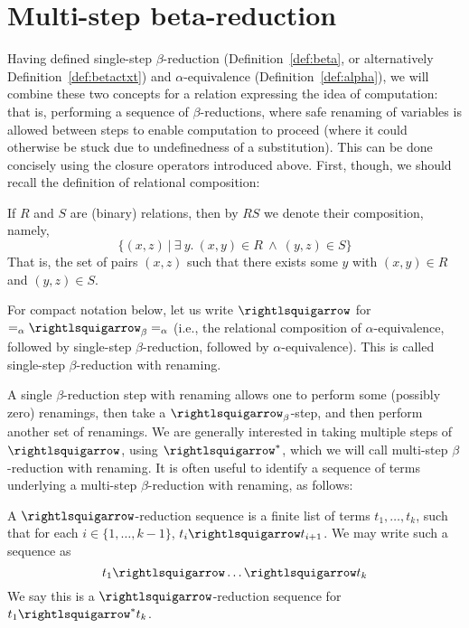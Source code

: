 \section{Multi-step beta-reduction}
\label{sec:multibeta}

Having defined single-step $\beta$-reduction
(Definition~\ref{def:beta}, or alternatively
Definition~\ref{def:betactxt}) and $\alpha$-equivalence
(Definition~\ref{def:alpha}), we will combine these two concepts for a
relation expressing the idea of computation: that is, performing a
sequence of $\beta$-reductions, where safe renaming of variables is
allowed between steps to enable computation to proceed (where it could
otherwise be stuck due to undefinedness of a substitution).  This can
be done concisely using the closure operators introduced above.
First, though, we should recall the definition of relational
composition:

\begin{definition}
  If $R$ and $S$ are (binary) relations, then by $R S$ we denote their
  composition, namely,
  \[
  \{ (x,z)\ |\ \exists\ y.\ (x,y)\in R \ \wedge\ (y,z) \in S \}
  \]
  \noindent That is, the set of pairs $(x,z)$ such that there exists some $y$ with
  $(x,y) \in R$ and $(y,z)\in S$.
\end{definition}

\begin{definition}
  For compact notation below, let us write $\betaa$ for $=_\alpha \betar =_\alpha$
  (i.e., the relational composition of
$\alpha$-equivalence, followed by single-step $\beta$-reduction,
followed by $\alpha$-equivalence).  This is called single-step
$\beta$-reduction with renaming.
\end{definition}

A single $\beta$-reduction step with renaming allows one to perform some (possibly zero)
renamings, then take a $\betar$-step, and then perform another set of renamings.
We are generally interested in taking multiple steps of $\betaa$, using $\betaa^*$, which
we will call multi-step $\beta$-reduction with renaming.
It is often useful to identify a sequence of terms underlying a
multi-step $\beta$-reduction with renaming, as follows:

\begin{definition}
\label{def:betars}
  A $\betaa$-reduction sequence is a finite list of terms
  $t_1,\ldots,t_k$, such that for each $i\in\{1,\ldots,k-1\}$,
  $t_i \betaa t_{i+1}$.  We may write such
  a sequence as
  \[
  t_1 \betaa \ldots \betaa t_k
  \]
  We say this is a $\betaa$-reduction sequence for $t_1\betaa^* t_k$.
\end{definition}

